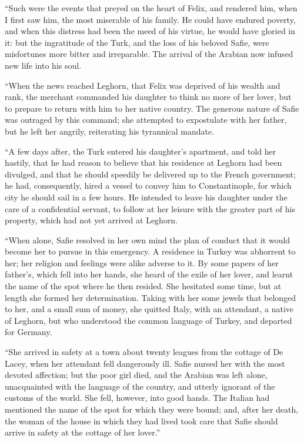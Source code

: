 ``Such were the events that preyed
on the heart of Felix, and rendered
him, when I first saw him, the most
miserable of his family. He could
have endured poverty, and when this
distress had been the meed of his virtue,
he would have gloried in it: but
the ingratitude of the Turk, and the
loss of his beloved Safie, were misfortunes
more bitter and irreparable. The
arrival of the Arabian now infused new
life into his soul.

``When the news reached Leghorn,
that Felix was deprived of his wealth
and rank, the merchant commanded
his daughter to think no more of her
lover, but to prepare to return with
him to her native country. The generous
nature of Safie was outraged by
this command; she attempted to expostulate
with her father, but he left
her angrily, reiterating his tyrannical
mandate.

``A few days after, the Turk entered
his daughter's apartment, and told her
hastily, that he had reason to believe
that his residence at Leghorn had been
divulged, and that he should speedily
be delivered up to the French
government; he had, consequently, hired a
vessel to convey him to Constantinople,
for which city he should sail in a few
hours. He intended to leave his daughter
under the care of a confidential
servant, to follow at her leisure with
the greater part of his property, which
had not yet arrived at Leghorn.

``When alone, Safie resolved in her
own mind the plan of conduct that it
would become her to pursue in this
emergency. A residence in Turkey
was abhorrent to her; her religion and
feelings were alike adverse to it. By
some papers of her father's, which fell
into her hands, she heard of the exile
of her lover, and learnt the name of
the spot where he then resided. She
hesitated some time, but at length she
formed her determination. Taking
with her some jewels that belonged to
her, and a small sum of money, she
quitted Italy, with an attendant, a native
of Leghorn, but who understood
the common language of Turkey, and
departed for Germany.

``She arrived in safety at a town
about twenty leagues from the cottage
of De Lacey, when her attendant fell
dangerously ill. Safie nursed her with
the most devoted affection; but the
poor girl died, and the Arabian was
left alone, unacquainted with the language
of the country, and utterly ignorant
of the customs of the world. She
fell, however, into good hands. The
Italian had mentioned the name of the
spot for which they were bound; and,
after her death, the woman of the house
in which they had lived took care that
Safie should arrive in safety at the cottage
of her lover.''

